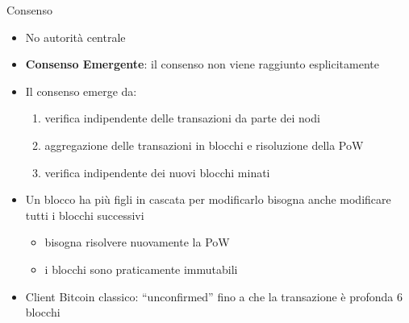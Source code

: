 \documentclass{beamer}
\begin{document}
  \begin{frame}{Consenso}
    \begin{itemize}
        \item No autorità centrale
        \item \textbf{Consenso Emergente}: il consenso non viene raggiunto esplicitamente
        \item Il consenso emerge da:
        \begin{enumerate}
            \item verifica indipendente delle transazioni da parte dei nodi
            \item aggregazione delle transazioni in blocchi e risoluzione della PoW
            \item verifica indipendente dei nuovi blocchi minati 
        \end{enumerate}
        \item Un blocco ha più figli in cascata \MVRightarrow per modificarlo bisogna anche modificare tutti i blocchi successivi
         \begin{itemize}
             \item[\MVRightarrow] bisogna risolvere nuovamente la PoW 
             \item[\MVRightarrow] i blocchi sono praticamente immutabili
         \end{itemize}
        \item Client Bitcoin classico:  ``unconfirmed'' fino a che la transazione è profonda 6 blocchi
    \end{itemize}
  \end{frame}
  
  
  
\end{document}
